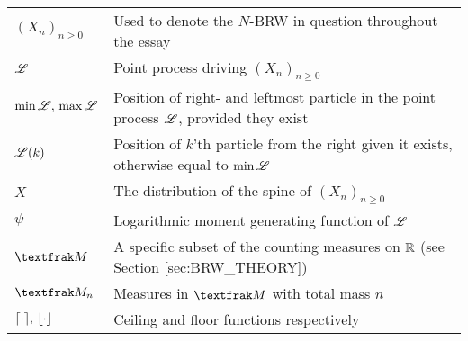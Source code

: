 \begin{tabularx}{\linewidth}{ l X }
$(X_n)_{n \geq 0}$ 		& Used to denote the $N$-BRW in question throughout the essay \\
$\mathscr{L}$				& Point process driving $(X_n)_{n \geq 0}$ \\
$\min \mathscr{L},\,\max \mathscr{L}$			& Position of right- and leftmost particle in the point process $\mathscr{L}$, provided they exist \\
$\mathscr{L}(k)$ 			& Position of $k$'th particle from the right given it exists, otherwise equal to $\min \mathscr{L}$ \\
$X$ 					& The distribution of the spine of $(X_n)_{n \geq 0}$ \\
$\psi$ 					& Logarithmic moment generating function of $\mathscr{L}$ \\
$\frak{M}$				& A specific subset of the counting measures on $\mathbb{R}$ (see Section \ref{sec:BRW_THEORY})\\
$\frak{M}_n$			& Measures in $\frak{M}$ with total mass $n$ \\
$\lceil\cdot\rceil,\,\lfloor\cdot\rfloor$ & Ceiling and floor functions respectively 
\end{tabularx}\hfill
